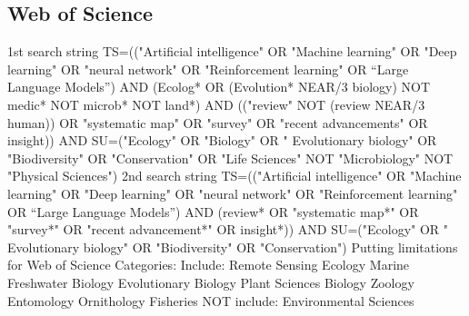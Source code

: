 \documentclass{article}
\begin{document}
\subsection{Web of Science}
1st search string
TS=(("Artificial intelligence" OR "Machine learning" OR "Deep learning" OR "neural network" OR "Reinforcement learning" OR “Large Language Models”) AND (Ecolog* OR (Evolution* NEAR/3 biology) NOT medic* NOT microb* NOT land*) AND (("review" NOT (review NEAR/3 human)) OR "systematic map" OR "survey" OR "recent advancements" OR insight)) AND SU=("Ecology" OR "Biology" OR " Evolutionary biology" OR "Biodiversity" OR "Conservation" OR "Life Sciences" NOT "Microbiology" NOT "Physical Sciences")
2nd search string
TS=(("Artificial intelligence" OR "Machine learning" OR "Deep learning" OR "neural network" OR "Reinforcement learning" OR “Large Language Models”) AND (review* OR "systematic map*" OR "survey*" OR "recent advancement*" OR insight*)) AND SU=("Ecology" OR " Evolutionary biology" OR "Biodiversity" OR "Conservation")
Putting limitations for Web of Science Categories:
Include:
Remote Sensing
Ecology
Marine Freshwater Biology
Evolutionary Biology
Plant Sciences
Biology
Zoology
Entomology
Ornithology
Fisheries
NOT include:
Environmental Sciences
\end{document}
